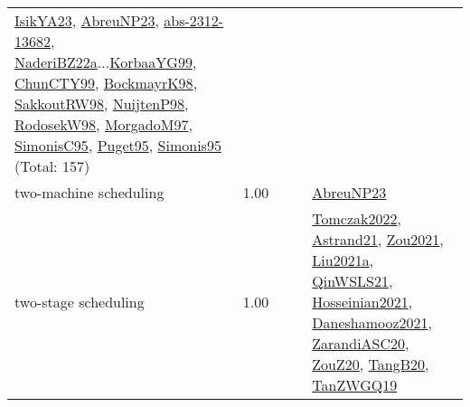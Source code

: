 {\begin{longtable}{p{3cm}r>{\raggedright\arraybackslash}p{6cm}>{\raggedright\arraybackslash}p{6cm}>{\raggedright\arraybackslash}p{8cm}}
\hyperref[detail:IsikYA23]{IsikYA23}, \hyperref[detail:AbreuNP23]{AbreuNP23}, \hyperref[detail:abs-2312-13682]{abs-2312-13682}, \hyperref[detail:NaderiBZ22a]{NaderiBZ22a}...\hyperref[detail:KorbaaYG99]{KorbaaYG99}, \hyperref[detail:ChunCTY99]{ChunCTY99}, \hyperref[detail:BockmayrK98]{BockmayrK98}, \hyperref[detail:SakkoutRW98]{SakkoutRW98}, \hyperref[detail:NuijtenP98]{NuijtenP98}, \hyperref[detail:RodosekW98]{RodosekW98}, \hyperref[detail:MorgadoM97]{MorgadoM97}, \hyperref[detail:SimonisC95]{SimonisC95}, \hyperref[detail:Puget95]{Puget95}, \hyperref[detail:Simonis95]{Simonis95} (Total: 157)\\
\index{two-machine scheduling}\index{Concepts!two-machine scheduling}two-machine scheduling &  1.00 &  &  & \hyperref[detail:AbreuNP23]{AbreuNP23}\\
\index{two-stage scheduling}\index{Concepts!two-stage scheduling}two-stage scheduling &  1.00 &  &  & \hyperref[detail:Tomczak2022]{Tomczak2022}, \hyperref[detail:Astrand21]{Astrand21}, \hyperref[detail:Zou2021]{Zou2021}, \hyperref[detail:Liu2021a]{Liu2021a}, \hyperref[detail:QinWSLS21]{QinWSLS21}, \hyperref[detail:Hosseinian2021]{Hosseinian2021}, \hyperref[detail:Daneshamooz2021]{Daneshamooz2021}, \hyperref[detail:ZarandiASC20]{ZarandiASC20}, \hyperref[detail:ZouZ20]{ZouZ20}, \hyperref[detail:TangB20]{TangB20}, \hyperref[detail:TanZWGQ19]{TanZWGQ19}\\

\end{longtable}}
